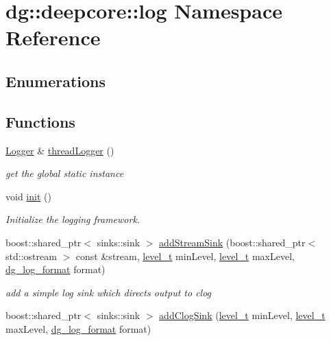 \hypertarget{namespacedg_1_1deepcore_1_1log}{}\section{dg\+:\+:deepcore\+:\+:log Namespace Reference}
\label{namespacedg_1_1deepcore_1_1log}
\subsection*{Enumerations}
\subsection*{Functions}
\begin{DoxyCompactItemize}
\item 
\hyperlink{classdg_1_1deepcore_1_1_logger}{Logger} \& \hyperlink{group___utility_module_ga94a3335f72a1830e58c8386c35015b2b}{thread\+Logger} ()
\begin{DoxyCompactList}\small\item\em get the global static instance \end{DoxyCompactList}\item 
void \hyperlink{group___utility_module_gaedfd950d41ec88d7eff2a7a9929e45e8}{init} ()
\begin{DoxyCompactList}\small\item\em Initialize the logging framework. \end{DoxyCompactList}\item 
boost\+::shared\+\_\+ptr$<$ sinks\+::sink $>$ \hyperlink{group___utility_module_gafe05a271abd51b48bd7dea8104793704}{add\+Stream\+Sink} (boost\+::shared\+\_\+ptr$<$ std\+::ostream $>$ const \&stream, \hyperlink{namespacedg_1_1deepcore_ac108b40b3a6b8e3450281eb787e27d6b}{level\+\_\+t} min\+Level, \hyperlink{namespacedg_1_1deepcore_ac108b40b3a6b8e3450281eb787e27d6b}{level\+\_\+t} max\+Level, \hyperlink{namespacedg_1_1deepcore_1_1log_a6851fd8d8bef57cbcaba93f7bed8fdbd}{dg\+\_\+log\+\_\+format} format)
\begin{DoxyCompactList}\small\item\em add a simple log sink which directs output to clog \end{DoxyCompactList}\item 
boost\+::shared\+\_\+ptr$<$ sinks\+::sink $>$ \hyperlink{group___utility_module_ga9db801100c707255528a26083ff913df}{add\+Clog\+Sink} (\hyperlink{namespacedg_1_1deepcore_ac108b40b3a6b8e3450281eb787e27d6b}{level\+\_\+t} min\+Level, \hyperlink{namespacedg_1_1deepcore_ac108b40b3a6b8e3450281eb787e27d6b}{level\+\_\+t} max\+Level, \hyperlink{namespacedg_1_1deepcore_1_1log_a6851fd8d8bef57cbcaba93f7bed8fdbd}{dg\+\_\+log\+\_\+format} format)

\end{DoxyCompactItemize}
